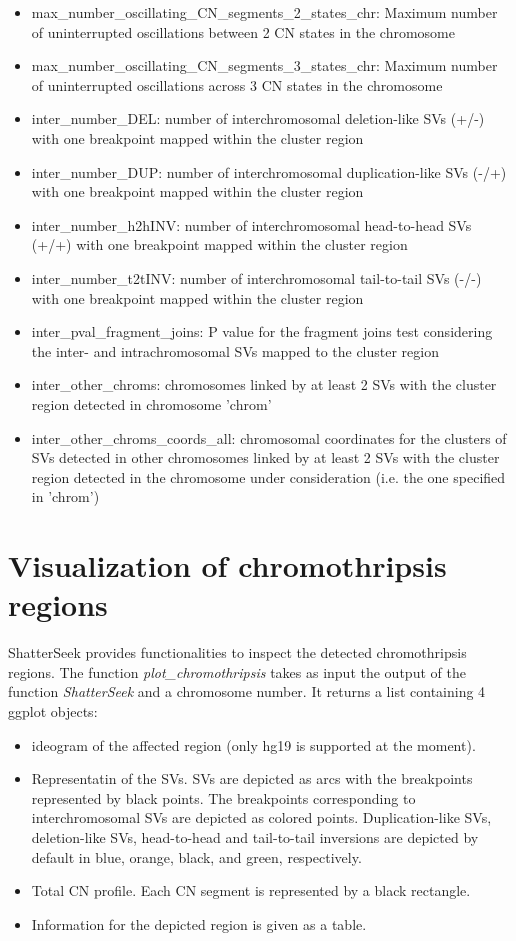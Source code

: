 \documentclass[twoside,a4wide,11pt]{article}\usepackage[]{graphicx}\usepackage[]{color}
\begin{document}
\begin{itemize}
\item max\_number\_oscillating\_CN\_segments\_2\_states\_chr: Maximum number of uninterrupted oscillations between 2 CN states in the chromosome
\item max\_number\_oscillating\_CN\_segments\_3\_states\_chr: Maximum number of uninterrupted oscillations across 3 CN states in the chromosome
\item inter\_number\_DEL: number of interchromosomal deletion-like SVs (+/-) with one breakpoint mapped within the cluster region
\item inter\_number\_DUP: number of interchromosomal duplication-like SVs (-/+) with one breakpoint mapped within the cluster region
\item inter\_number\_h2hINV: number of interchromosomal head-to-head SVs (+/+) with one breakpoint mapped within the cluster region
\item inter\_number\_t2tINV: number of interchromosomal tail-to-tail SVs (-/-) with one breakpoint mapped within the cluster region
\item inter\_pval\_fragment\_joins: P value for the fragment joins test considering the inter- and intrachromosomal SVs mapped to the cluster region
\item inter\_other\_chroms: chromosomes linked by at least 2 SVs with the cluster region detected in chromosome 'chrom'
\item inter\_other\_chroms\_coords\_all: chromosomal coordinates for the clusters of SVs detected in other chromosomes linked by at least 2 SVs with the cluster region detected in the chromosome under consideration (i.e. the one specified in 'chrom')
\end{itemize}






\section{Visualization of chromothripsis regions}

ShatterSeek provides functionalities to inspect the detected chromothripsis regions. 
The function {\it plot\_chromothripsis} takes as input the output of the function 
{\it ShatterSeek} and a chromosome number. 
It returns a list containing 4 ggplot objects:
\begin{itemize}
\item ideogram of the affected region (only hg19 is supported at the moment). 
\item Representatin of the SVs. SVs are depicted as arcs with the breakpoints represented by black points. 
The breakpoints corresponding to interchromosomal SVs are depicted as colored points.
Duplication-like SVs, deletion-like SVs, head-to-head and tail-to-tail inversions are depicted by default in blue, orange, black, and green, respectively.
\item Total CN profile. Each CN segment is represented by a black rectangle.
\item Information for the depicted region is given as a table.
\end{itemize} 
\end{document}
